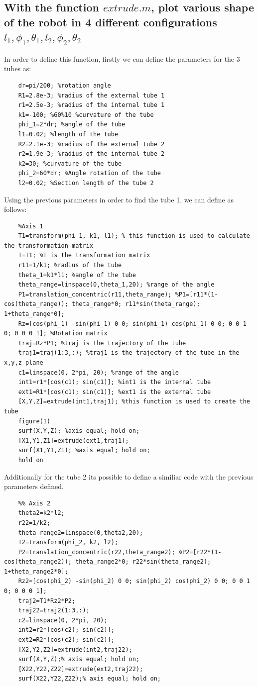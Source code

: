 \documentclass[12pt, twoside]{report}
\begin{document}
\subsection{With the function $extrude.m$, plot various shape of the robot in 4 different configurations $l_1 , \phi_1 , \theta_1 ,l_2 , \phi_2 , \theta_2 $}
In order to define this function, firstly we can define the parameters for the 3 tubes as:
\begin{lstlisting}
    dr=pi/200; %rotation angle 
    R1=2.8e-3; %radius of the external tube 1
    r1=2.5e-3; %radius of the internal tube 1
    k1=-100; %60%10 %curvature of the tube 
    phi_1=2*dr; %angle of the tube
    l1=0.02; %length of the tube
    R2=2.1e-3; %radius of the external tube 2
    r2=1.9e-3; %radius of the internal tube 2
    k2=30; %curvature of the tube
    phi_2=60*dr; %Angle rotation of the tube  
    l2=0.02; %Section length of the tube 2
\end{lstlisting}
Using the previous parameters in order to find the tube 1, we can define as follows: \\
\begin{lstlisting}
    %Axis 1
    T1=transform(phi_1, k1, l1); % this function is used to calculate the transformation matrix
    T=T1; %T is the transformation matrix
    r11=1/k1; %radius of the tube
    theta_1=k1*l1; %angle of the tube
    theta_range=linspace(0,theta_1,20); %range of the angle
    P1=translation_concentric(r11,theta_range); %P1=[r11*(1-cos(theta_range)); theta_range*0; r11*sin(theta_range); 1+theta_range*0];
    Rz=[cos(phi_1) -sin(phi_1) 0 0; sin(phi_1) cos(phi_1) 0 0; 0 0 1 0; 0 0 0 1]; %Rotation matrix
    traj=Rz*P1; %traj is the trajectory of the tube
    traj1=traj(1:3,:); %traj1 is the trajectory of the tube in the x,y,z plane
    c1=linspace(0, 2*pi, 20); %range of the angle
    int1=r1*[cos(c1); sin(c1)]; %int1 is the internal tube
    ext1=R1*[cos(c1); sin(c1)]; %ext1 is the external tube
    [X,Y,Z]=extrude(int1,traj1); %this function is used to create the tube
    figure(1)
    surf(X,Y,Z); %axis equal; hold on;
    [X1,Y1,Z1]=extrude(ext1,traj1);
    surf(X1,Y1,Z1); %axis equal; hold on;
    hold on
\end{lstlisting}
Additionally for the tube 2 its possible to define a similiar code with the previous parameters defined.\\
\begin{lstlisting}
    %% Axis 2  
    theta2=k2*l2;
    r22=1/k2;
    theta_range2=linspace(0,theta2,20);
    T2=transform(phi_2, k2, l2);
    P2=translation_concentric(r22,theta_range2); %P2=[r22*(1-cos(theta_range2)); theta_range2*0; r22*sin(theta_range2); 1+theta_range2*0];
    Rz2=[cos(phi_2) -sin(phi_2) 0 0; sin(phi_2) cos(phi_2) 0 0; 0 0 1 0; 0 0 0 1];
    traj2=T1*Rz2*P2;
    traj22=traj2(1:3,:);
    c2=linspace(0, 2*pi, 20);
    int2=r2*[cos(c2); sin(c2)];
    ext2=R2*[cos(c2); sin(c2)];
    [X2,Y2,Z2]=extrude(int2,traj22);
    surf(X,Y,Z);% axis equal; hold on;
    [X22,Y22,Z22]=extrude(ext2,traj22);
    surf(X22,Y22,Z22);% axis equal; hold on;
\end{lstlisting}
\end{document}
